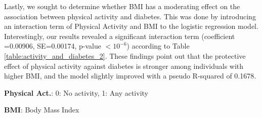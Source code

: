 \documentclass[11pt]{article}
\begin{document}
Lastly, we sought to determine whether BMI has a moderating effect on the association between physical activity and diabetes. This was done by introducing an interaction term of Physical Activity and BMI to the logistic regression model. Interestingly, our results revealed a significant interaction term (coefficient =0.00906, SE=0.00174, p-value $<$$10^{-6}$) according to Table \ref{table:activity_and_diabetes_2}. These findings point out that the protective effect of physical activity against diabetes is stronger among individuals with higher BMI, and the model slightly improved with a pseudo R-squared of 0.1678.

\begin{table}[h]
\caption{Moderating effect of BMI on the association between physical activity and diabetes}
\label{table:activity_and_diabetes_2}
\begin{threeparttable}
\renewcommand{\TPTminimum}{\linewidth}
\begin{tablenotes}
\footnotesize
\item \textbf{Physical Act.}: 0: No activity, 1: Any activity
\item \textbf{BMI}: Body Mass Index

\end{tablenotes}
\end{threeparttable}
\end{table}
\end{document}
